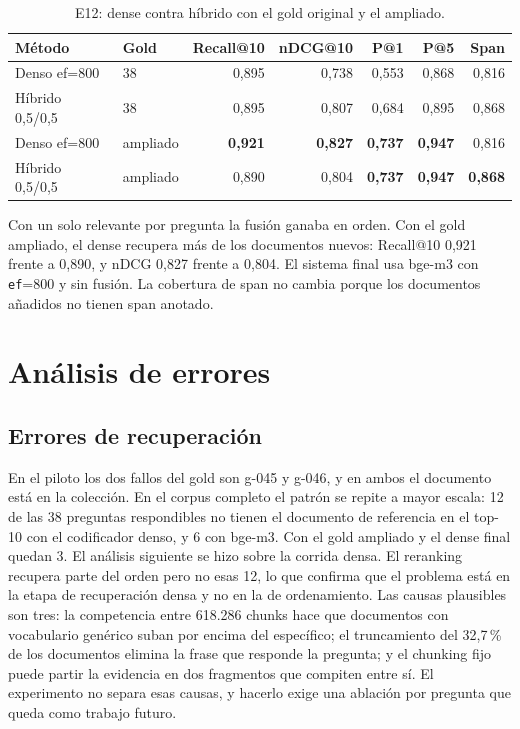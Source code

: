 \documentclass[11pt]{tg_usta}
\begin{document}
\begin{table}[htbp]
\centering
\footnotesize
\begin{tabular}{@{}llrrrrr@{}}
\toprule
Método & Gold & Recall@10 & nDCG@10 & P@1 & P@5 & Span \\
\midrule
Denso ef=800 & 38 & 0,895 & 0,738 & 0,553 & 0,868 & 0,816 \\
Híbrido 0,5/0,5 & 38 & 0,895 & 0,807 & 0,684 & 0,895 & 0,868 \\
Denso ef=800 & ampliado & \textbf{0,921} & \textbf{0,827} & \textbf{0,737} & \textbf{0,947} & 0,816 \\
Híbrido 0,5/0,5 & ampliado & 0,890 & 0,804 & \textbf{0,737} & \textbf{0,947} & \textbf{0,868} \\
\bottomrule
\end{tabular}
\caption{E12: dense contra híbrido con el gold original y el ampliado.}
\label{tab:e12}
\end{table}

Con un solo relevante por pregunta la fusión ganaba en orden. Con el gold ampliado, el dense recupera más de los documentos nuevos: Recall@10 0,921 frente a 0,890, y nDCG 0,827 frente a 0,804. El sistema final usa bge-m3 con \texttt{ef}=800 y sin fusión. La cobertura de span no cambia porque los documentos añadidos no tienen span anotado.

\section{Análisis de errores}

\subsection{Errores de recuperación}

En el piloto los dos fallos del gold son g-045 y g-046, y en ambos el documento está en la colección. En el corpus completo el patrón se repite a mayor escala: 12 de las 38 preguntas respondibles no tienen el documento de referencia en el top-10 con el codificador denso, y 6 con bge-m3. Con el gold ampliado y el dense final quedan 3. El análisis siguiente se hizo sobre la corrida densa. El reranking recupera parte del orden pero no esas 12, lo que confirma que el problema está en la etapa de recuperación densa y no en la de ordenamiento. Las causas plausibles son tres: la competencia entre 618.286 chunks hace que documentos con vocabulario genérico suban por encima del específico; el truncamiento del 32,7\,\% de los documentos elimina la frase que responde la pregunta; y el chunking fijo puede partir la evidencia en dos fragmentos que compiten entre sí. El experimento no separa esas causas, y hacerlo exige una ablación por pregunta que queda como trabajo futuro.
\end{document}
